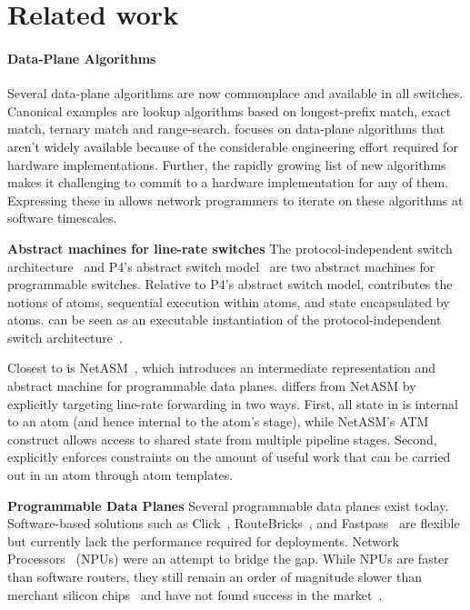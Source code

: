 \section{Related work}
\label{s:related}

\paragraph{Data-Plane Algorithms}
Several data-plane algorithms are now commonplace and available in all
switches. Canonical examples are lookup algorithms based on longest-prefix
match, exact match, ternary match and range-search. \pktlanguage focuses on
data-plane algorithms that aren't widely available because of the considerable
engineering effort required for hardware implementations. Further, the rapidly
growing list of new algorithms~\cite{pdq, d3, detail, codel, conga} makes it
challenging to commit to a hardware implementation for any of them.  Expressing
these in \pktlanguage allows network programmers to iterate on these algorithms
at software timescales.

\textbf{Abstract machines for line-rate switches}
The protocol-independent switch architecture~\cite{nick_p4} and P4's abstract
switch model~\cite{p4} are two abstract machines for programmable switches.
Relative to P4's abstract switch model, \absmachine contributes the notions of
atoms, sequential execution within atoms, and state encapsulated by atoms.
\absmachine can be seen as an executable instantiation of the
protocol-independent switch architecture~\cite{nick_p4}.

Closest to \absmachine is NetASM~\cite{netasm}, which introduces an
intermediate representation and abstract machine for programmable data planes.
\absmachine differs from NetASM by explicitly targeting line-rate forwarding in
two ways.  First, all state in \absmachine is internal to an atom (and hence
internal to the atom's stage), while NetASM's ATM construct allows access to
shared state from multiple pipeline stages. Second, \absmachine explicitly
enforces constraints on the amount of useful work that can be carried out in an
atom through atom templates.

\textbf{Programmable Data Planes}
Several programmable data planes exist today. Software-based solutions such as
Click~\cite{click}, RouteBricks~\cite{routebricks}, and Fastpass~\cite{fastpass}
are flexible but currently lack the performance
required for deployments. Network Processors~\cite{ixp2800, ixp4xx} (NPUs) were
an attempt to bridge the gap.  While NPUs are faster than software routers,
they still remain an order of magnitude slower than merchant silicon
chips~\cite{rmt} and have not found success in the market~\cite{npfail}.


